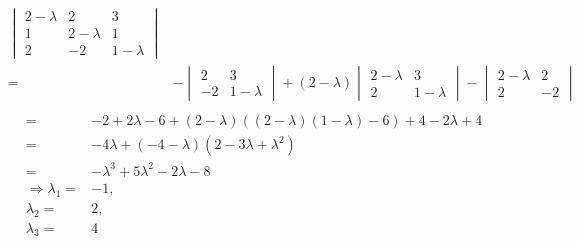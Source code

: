 \documentclass{HM}
\begin{document}
\begin{enumerate}
\begin{align*}
\begin{vmatrix}
			2-\lambda&2&3\\
			1&2-\lambda&1\\
			2&-2&1-\lambda
		\end{vmatrix}\\
		=&-\begin{vmatrix}
			2&3\\
			-2&1-\lambda
		\end{vmatrix}+(2-\lambda)\begin{vmatrix}
			2-\lambda&3\\
			2&1-\lambda
		\end{vmatrix}-\begin{vmatrix}
			2-\lambda&2\\
			2&-2
		\end{vmatrix}\\
	\end{align*}
	\begin{align*}
		=&-2+2\lambda-6+(2-\lambda)((2-\lambda)(1-\lambda)-6)+4-2\lambda+4\\
		=&-4\lambda+(-4-\lambda)(2-3\lambda+\lambda^2)\\
		=&-\lambda^3+5\lambda^2-2\lambda-8\\
		\Rightarrow\lambda_1=&-1,\\
		\lambda_2=& 2,\\
		\lambda_3=& 4\\
	\end{align*}
	

\end{enumerate}
\end{document}
